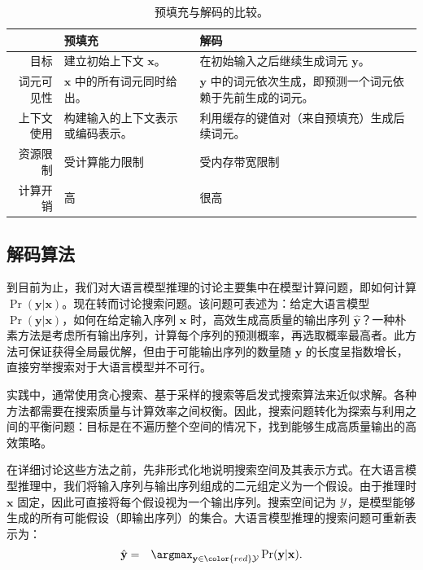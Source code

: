 \begin{table}[!t]
\centering
\begingroup
\renewcommand{\arraystretch}{1.2}
\begin{tabular}{r | L{0.30\textwidth} | L{0.30\textwidth}}
& 预填充 & 解码  \\  \hline
目标 & 建立初始上下文 $\mathbf{x}$。 & 在初始输入之后继续生成词元 $\mathbf{y}$。 \\ \hline
词元可见性 & $\mathbf{x}$ 中的所有词元同时给出。 & $\mathbf{y}$ 中的词元依次生成，即预测一个词元依赖于先前生成的词元。 \\ \hline
上下文使用 & 构建输入的上下文表示或编码表示。 & 利用缓存的键值对（来自预填充）生成后续词元。 \\ \hline
资源限制 & 受计算能力限制 & 受内存带宽限制 \\ \hline
计算开销 & 高 & 很高
\end{tabular}
\endgroup
\caption{预填充与解码的比较。}
\label{tab:prefilling-vs-decoding}
\end{table}

\subsection{解码算法}
\label{sec:llm-decoding-algorithms}

到目前为止，我们对大语言模型推理的讨论主要集中在模型计算问题，即如何计算 $\Pr(\mathbf{y}|\mathbf{x})$。现在转而讨论搜索问题。该问题可表述为：给定大语言模型 $\Pr(\mathbf{y}|\mathbf{x})$，如何在给定输入序列 $\mathbf{x}$ 时，高效生成高质量的输出序列 $\hat{\mathbf{y}}$？一种朴素方法是考虑所有输出序列，计算每个序列的预测概率，再选取概率最高者。此方法可保证获得全局最优解，但由于可能输出序列的数量随 $\mathbf{y}$ 的长度呈指数增长，直接穷举搜索对于大语言模型并不可行。

实践中，通常使用贪心搜索、基于采样的搜索等启发式搜索算法来近似求解。各种方法都需要在搜索质量与计算效率之间权衡。因此，搜索问题转化为探索与利用之间的平衡问题：目标是在不遍历整个空间的情况下，找到能够生成高质量输出的高效策略。

在详细讨论这些方法之前，先非形式化地说明搜索空间及其表示方式。在大语言模型推理中，我们将输入序列与输出序列组成的二元组定义为一个假设。由于推理时 $\mathbf{x}$ 固定，因此可直接将每个假设视为一个输出序列。搜索空间记为 $\mathcal{Y}$，是模型能够生成的所有可能假设（即输出序列）的集合。大语言模型推理的搜索问题可重新表示为：
\begin{eqnarray}
\hat{\mathbf{y}} & = & \argmax_{\mathbf{y} \in {\color{red} \mathcal{Y}}} \Pr(\mathbf{y}|\mathbf{x}). \label{eq:llm-general-decoding-objective}
\end{eqnarray}

